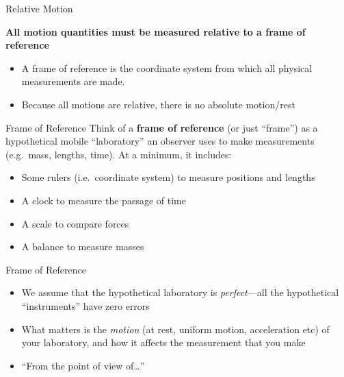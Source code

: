 \documentclass[12pt,compress,aspectratio=169]{beamer}
\begin{document}
\begin{frame}{Relative Motion}
  
  \begin{block}{}
    \textbf{All motion quantities must be measured relative to a frame of
      reference}
  \end{block}

  \vspace{.2in}
  \begin{itemize}
  \item A frame of reference is the coordinate system from which all physical
    measurements are made.
  \item Because all motions are relative, there is no absolute motion/rest
  \end{itemize}
\end{frame}  



\begin{frame}{Frame of Reference}
  Think of a \textbf{frame of reference} (or just ``frame'') as a hypothetical
  mobile ``laboratory'' an observer uses to make measurements (e.g.\ mass,
  lengths, time). At a minimum, it includes:
  \begin{itemize}
  \item Some rulers (i.e.\ coordinate system) to measure positions and lengths
  \item A clock to measure the passage of time
  \item A scale to compare forces
  \item A balance to measure masses
  \end{itemize}
\end{frame}



\begin{frame}{Frame of Reference}
  \begin{itemize}
  \item We assume that the hypothetical laboratory is \emph{perfect}---all the
    hypothetical ``instruments'' have zero errors
  \item What matters is the \emph{motion} (at rest, uniform motion, acceleration
    etc) of your laboratory, and how it affects the measurement that you make
  \item ``From the point of view of\ldots''
  \end{itemize}
\end{frame}
\end{document}
